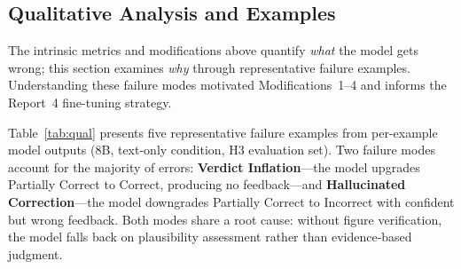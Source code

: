 \documentclass{article}
\begin{document}
\clearpage

\subsection{Qualitative Analysis and Examples}
\label{sec:qual}

The intrinsic metrics and modifications above quantify \emph{what} the model gets
wrong; this section examines \emph{why} through representative failure examples.
Understanding these failure modes motivated Modifications~1--4 and informs the
Report~4 fine-tuning strategy.

 Table~\ref{tab:qual} presents five representative failure examples from
per-example model outputs (8B, text-only condition, H3 evaluation set). Two failure
modes account for the majority of errors: \textbf{Verdict Inflation}---the model
upgrades Partially Correct to Correct, producing no feedback---and
\textbf{Hallucinated Correction}---the model downgrades Partially Correct to
Incorrect with confident but wrong feedback. Both modes share a root cause: without
figure verification, the model falls back on plausibility assessment rather than
evidence-based judgment.
\end{document}

